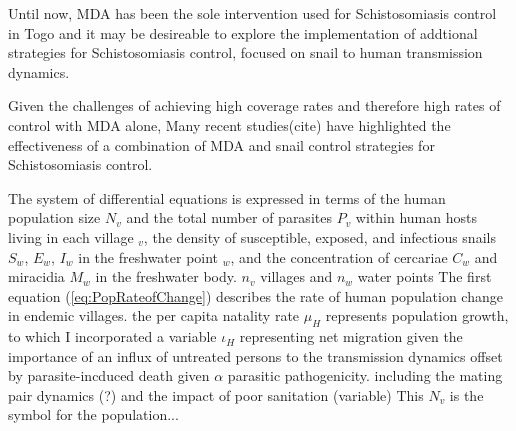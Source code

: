 \documentclass[12pt]{article}
\begin{document}





Until now, MDA has been the sole intervention used for Schistosomiasis control in Togo and 
it may be desireable to explore the implementation of addtional strategies for Schistosomiasis control, focused on snail to human transmission dynamics. 

Given the challenges of achieving high coverage rates and therefore high rates of control with MDA alone, Many recent studies(cite) have highlighted the effectiveness of a combination of MDA and snail control strategies for Schistosomiasis control. 


The system of differential equations is expressed in terms of the human population size $N_v$ and the total number of parasites $P_v$ within human hosts living in each village $_v$, the density of susceptible, exposed, and infectious snails $S_w$, $E_w$, $I_w$ in the freshwater point $_w$, and the concentration of cercariae $C_w$ and miracidia $M_w$ in the freshwater body.
$n_v$ villages and $n_w$ water points
The first equation (\ref{eq:PopRateofChange}) describes the rate of human population change in endemic villages. the per capita natality rate $\mu_H$ represents population growth, to which I incorporated a variable $\iota_H$ representing net migration given the importance of an influx of untreated persons to the transmission dynamics
 offset by parasite-incduced death given $\alpha$ parasitic pathogenicity.
including the mating pair dynamics (?) and the impact of poor sanitation (variable)
This $N_v$ is the symbol for the population...


 
\end{document}
